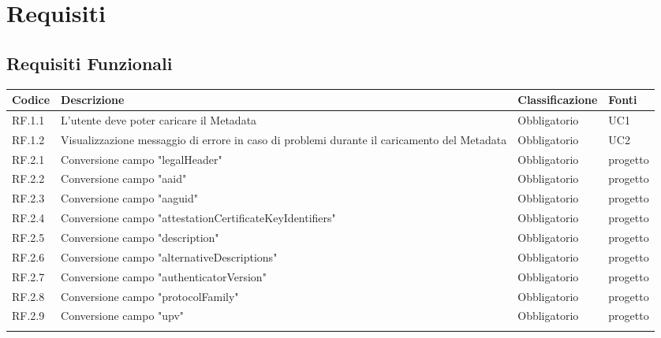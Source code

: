 \chapter{Requisiti}
\section{Requisiti Funzionali}

\begin{center}
  \centering
  \begin{longtable}{|L{2cm}|C{5,5cm}|C{3cm}|C{2cm}|}
    \hline
    \textcolor[HTML]{FFFFFF}{\textbf{Codice}} & \textcolor[HTML]{FFFFFF}{\textbf{Descrizione}} & \textcolor[HTML]{FFFFFF}{\textbf{Classificazione}} & \textcolor[HTML]{FFFFFF}{\textbf{Fonti}}
    \\ \hline
    RF.1.1 & L'utente deve poter caricare il Metadata & Obbligatorio & UC1 \\ \hline
    RF.1.2 & Visualizzazione messaggio di errore in caso di problemi durante il caricamento del Metadata & Obbligatorio & UC2 \\ \hline
    RF.2.1 & Conversione campo "legalHeader" & Obbligatorio & progetto \\ \hline
    RF.2.2 & Conversione campo "aaid" & Obbligatorio & progetto \\ \hline
    RF.2.3 & Conversione campo "aaguid" & Obbligatorio & progetto \\ \hline
    RF.2.4 & Conversione campo "attestationCertificateKeyIdentifiers" & Obbligatorio & progetto \\ \hline
    RF.2.5 & Conversione campo "description" & Obbligatorio & progetto \\ \hline
    RF.2.6 & Conversione campo "alternativeDescriptions" & Obbligatorio & progetto \\ \hline
    RF.2.7 & Conversione campo "authenticatorVersion" & Obbligatorio & progetto \\ \hline
    RF.2.8 & Conversione campo "protocolFamily" & Obbligatorio & progetto \\ \hline
    RF.2.9 & Conversione campo "upv" & Obbligatorio & progetto \\ \hline

\end{longtable}
\end{center}
